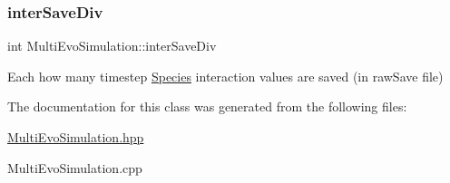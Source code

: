 \subsubsection{\texorpdfstring{inter\+Save\+Div}{interSaveDiv}}
{\footnotesize\ttfamily int Multi\+Evo\+Simulation\+::inter\+Save\+Div\hspace{0.3cm}{\ttfamily [protected]}}

Each how many timestep \hyperlink{classSpecies}{Species} interaction values are saved (in raw\+Save file) 

The documentation for this class was generated from the following files\+:\begin{DoxyCompactItemize}
\item 
\hyperlink{MultiEvoSimulation_8hpp}{Multi\+Evo\+Simulation.\+hpp}\item 
Multi\+Evo\+Simulation.\+cpp\end{DoxyCompactItemize}

